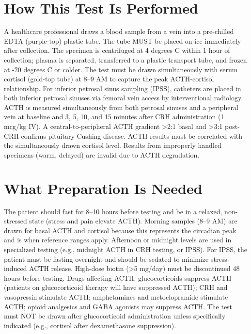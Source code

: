 \section*{How This Test Is Performed}
A healthcare professional draws a blood sample from a vein into a pre-chilled EDTA (purple-top) plastic tube. The tube MUST be placed on ice immediately after collection. The specimen is centrifuged at 4 degrees C within 1 hour of collection; plasma is separated, transferred to a plastic transport tube, and frozen at -20 degrees C or colder. The test must be drawn simultaneously with serum cortisol (gold-top tube) at 8--9 AM to capture the peak ACTH-cortisol relationship. For inferior petrosal sinus sampling (IPSS), catheters are placed in both inferior petrosal sinuses via femoral vein access by interventional radiology. ACTH is measured simultaneously from both petrosal sinuses and a peripheral vein at baseline and 3, 5, 10, and 15 minutes after CRH administration (1 mcg/kg IV). A central-to-peripheral ACTH gradient >2:1 basal and >3:1 post-CRH confirms pituitary Cushing disease. ACTH results must be correlated with the simultaneously drawn cortisol level. Results from improperly handled specimens (warm, delayed) are invalid due to ACTH degradation.

\section*{What Preparation Is Needed}
The patient should fast for 8--10 hours before testing and be in a relaxed, non-stressed state (stress and pain elevate ACTH). Morning samples (8--9 AM) are drawn for basal ACTH and cortisol because this represents the circadian peak and is when reference ranges apply. Afternoon or midnight levels are used in specialized testing (e.g., midnight ACTH in CRH testing, or IPSS). For IPSS, the patient must be fasting overnight and should be sedated to minimize stress-induced ACTH release. High-dose biotin (>5 mg/day) must be discontinued 48 hours before testing. Drugs affecting ACTH: glucocorticoids suppress ACTH (patients on glucocorticoid therapy will have suppressed ACTH); CRH and vasopressin stimulate ACTH; amphetamines and metoclopramide stimulate ACTH; opioid analgesics and GABA agonists may suppress ACTH. The test must NOT be drawn after glucocorticoid administration unless specifically indicated (e.g., cortisol after dexamethasone suppression).

